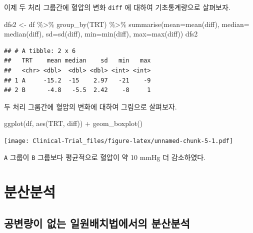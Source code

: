 \documentclass[
]{book}
\newenvironment{Shaded}{\begin{snugshade}}{\end{snugshade}}
\newcommand{\AttributeTok}[1]{\textcolor[rgb]{0.77,0.63,0.00}{#1}}
\newcommand{\FunctionTok}[1]{\textcolor[rgb]{0.00,0.00,0.00}{#1}}
\newcommand{\NormalTok}[1]{#1}
\newcommand{\OtherTok}[1]{\textcolor[rgb]{0.56,0.35,0.01}{#1}}
\newcommand{\SpecialCharTok}[1]{\textcolor[rgb]{0.00,0.00,0.00}{#1}}
\begin{document}
이제 두 처리 그룹간에 혈압의 변화 \texttt{diff} 에 대하여 기초통계량으로 살펴보자.

\begin{Shaded}
\begin{Highlighting}[]
\NormalTok{dfs2 }\OtherTok{\textless{}{-}}\NormalTok{ df }\SpecialCharTok{\%\textgreater{}\%} \FunctionTok{group\_by}\NormalTok{(TRT)  }\SpecialCharTok{\%\textgreater{}\%}  \FunctionTok{summarise}\NormalTok{(}\AttributeTok{mean=}\FunctionTok{mean}\NormalTok{(diff), }\AttributeTok{median=} \FunctionTok{median}\NormalTok{(diff), }\AttributeTok{sd=}\FunctionTok{sd}\NormalTok{(diff), }\AttributeTok{min=}\FunctionTok{min}\NormalTok{(diff), }\AttributeTok{max=}\FunctionTok{max}\NormalTok{(diff))}
\NormalTok{dfs2}
\end{Highlighting}
\end{Shaded}

\begin{verbatim}
## # A tibble: 2 x 6
##   TRT    mean median    sd   min   max
##   <chr> <dbl>  <dbl> <dbl> <int> <int>
## 1 A     -15.2  -15    2.97   -21    -9
## 2 B      -4.8   -5.5  2.42    -8     1
\end{verbatim}

두 처리 그룹간에 혈압의 변화에 대하여 그림으로 살펴보자.

\begin{Shaded}
\begin{Highlighting}[]
\FunctionTok{ggplot}\NormalTok{(df, }\FunctionTok{aes}\NormalTok{(TRT, diff)) }\SpecialCharTok{+}  \FunctionTok{geom\_boxplot}\NormalTok{()}
\end{Highlighting}
\end{Shaded}

\texttt{[image: Clinical-Trial\_files/figure-latex/unnamed-chunk-5-1.pdf]}

\texttt{A} 그룹이 \texttt{B} 그룹보다 평균적으로 혈압이 약 10 mmHg 더 감소하였다.

\hypertarget{uxbd84uxc0b0uxbd84uxc11d}{%
\section{분산분석}\label{uxbd84uxc0b0uxbd84uxc11d}}

\hypertarget{uxacf5uxbcc0uxb7c9uxc774-uxc5c6uxb294-uxc77cuxc6d0uxbc30uxce58uxbc95uxc5d0uxc11cuxc758-uxbd84uxc0b0uxbd84uxc11d}{%
\subsection{공변량이 없는 일원배치법에서의 분산분석}\label{uxacf5uxbcc0uxb7c9uxc774-uxc5c6uxb294-uxc77cuxc6d0uxbc30uxce58uxbc95uxc5d0uxc11cuxc758-uxbd84uxc0b0uxbd84uxc11d}}
\end{document}
